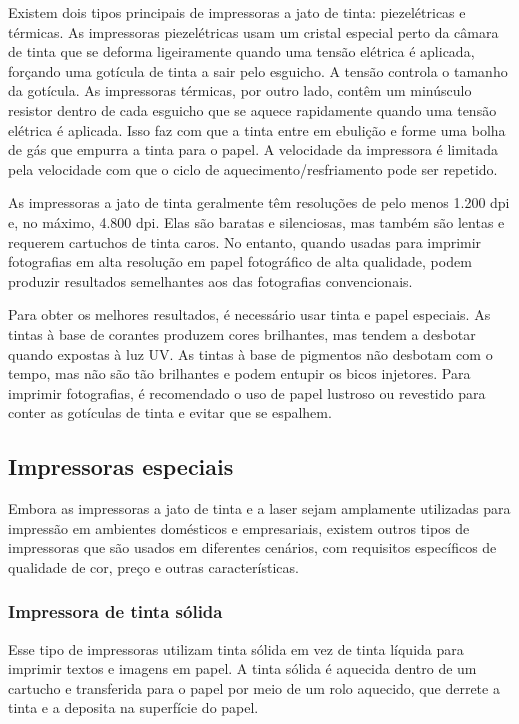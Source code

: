 \documentclass[12pt,a4, oneside, brazil]{article}
\begin{document}
		Existem dois tipos principais de impressoras a jato de tinta: piezelétricas e térmicas. As impressoras piezelétricas usam um cristal especial perto da câmara de tinta que se deforma ligeiramente quando uma tensão elétrica é aplicada, forçando uma gotícula de tinta a sair pelo esguicho. A tensão controla o tamanho da gotícula. As impressoras térmicas, por outro lado, contêm um minúsculo resistor dentro de cada esguicho que se aquece rapidamente quando uma tensão elétrica é aplicada. Isso faz com que a tinta entre em ebulição e forme uma bolha de gás que empurra a tinta para o papel. A velocidade da impressora é limitada pela velocidade com que o ciclo de aquecimento/resfriamento pode ser repetido.
		
		As impressoras a jato de tinta geralmente têm resoluções de pelo menos 1.200 dpi e, no máximo, 4.800 dpi. Elas são baratas e silenciosas, mas também são lentas e requerem cartuchos de tinta caros. No entanto, quando usadas para imprimir fotografias em alta resolução em papel fotográfico de alta qualidade, podem produzir resultados semelhantes aos das fotografias convencionais.
		
		Para obter os melhores resultados, é necessário usar tinta e papel especiais. As tintas à base de corantes produzem cores brilhantes, mas tendem a desbotar quando expostas à luz UV. As tintas à base de pigmentos não desbotam com o tempo, mas não são tão brilhantes e podem entupir os bicos injetores. Para imprimir fotografias, é recomendado o uso de papel lustroso ou revestido para conter as gotículas de tinta e evitar que se espalhem.
		
		\subsection{Impressoras especiais}
		Embora as impressoras a jato de tinta e a laser sejam amplamente utilizadas para impressão em ambientes domésticos e empresariais, existem outros tipos de impressoras que são usados em diferentes cenários, com requisitos específicos de qualidade de cor, preço e outras características.
		
			\subsubsection{Impressora de tinta sólida}
			
			Esse tipo de impressoras utilizam tinta sólida em vez de tinta líquida para imprimir textos e imagens em papel. A tinta sólida é aquecida dentro de um cartucho e transferida para o papel por meio de um rolo aquecido, que derrete a tinta e a deposita na superfície do papel.
			
\end{document}
